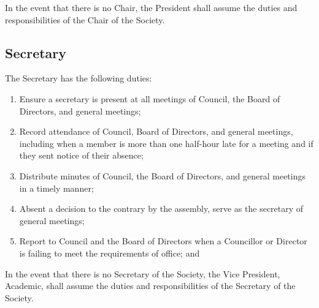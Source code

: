 In the event that there is no Chair, the President shall assume the duties and
responsibilities of the Chair of the Society. 

\subsection{Secretary}
The Secretary has the following duties:
\begin{enumerate}
    \item Ensure a secretary is present at all meetings of Council,
        the Board of Directors, and general meetings;
    \item Record attendance of Council, Board of Directors, and
        general meetings, including when a member is more than one half-hour
        late for a meeting and if they sent notice of their absence;
    \item Distribute minutes of Council, the Board of Directors, and 
        general meetings in a timely manner;
    \item Absent a decision to the contrary by the assembly, serve as the
        secretary of general meetings;
    \item Report to Council and the Board of Directors when a Councillor
        or Director is failing to meet the requirements of office; and
\end{enumerate}

In the event that there is no Secretary of the Society, the Vice President,
Academic, shall assume the duties and responsibilities of the Secretary of the
Society.
